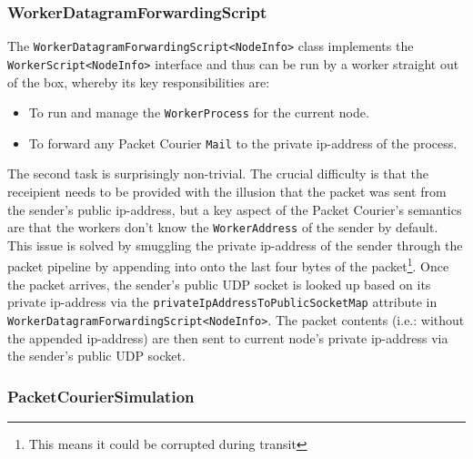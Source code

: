 \subsubsection{WorkerDatagramForwardingScript}\label{subsubsection:worker_datagram_forwarding_script}

The \texttt{WorkerDatagramForwardingScript<NodeInfo>} class implements the \texttt{WorkerScript<NodeInfo>} interface
and thus can be run by a worker straight out of the box, whereby its key responsibilities are:
\begin{itemize}
    \item To run and manage the \texttt{WorkerProcess} for the current node.
    \item To forward any Packet Courier \texttt{Mail} to the private ip-address of the process.
\end{itemize}

The second task is surprisingly non-trivial. The crucial difficulty is that the receipient needs to be provided with
the illusion that the packet was sent from the sender's public ip-address, but a key aspect of the Packet Courier's
semantics are that the workers don't know the \texttt{WorkerAddress} of the sender by default. This issue is solved
by smuggling the private ip-address of the sender through the packet pipeline by appending into onto the last four
bytes of the packet\footnote{This means it could be corrupted during transit}. Once the packet arrives, the sender's
public UDP socket is looked up based on its private ip-address via the \texttt{privateIpAddressToPublicSocketMap}
attribute in \texttt{WorkerDatagramForwardingScript<NodeInfo>}. The packet contents (i.e.: without the appended
ip-address) are then sent to current node's private ip-address via the sender's public UDP socket.

\subsubsection{PacketCourierSimulation}\label{subsubsection:packet_courier_simulation}

